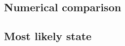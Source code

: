 \documentclass[a4paper, fontsize=11pt]{article}
\begin{document}
\paragraph{}


\subsection{Numerical comparison}



%
%
%
%
%



\subsection{Most likely state}




\end{document}
